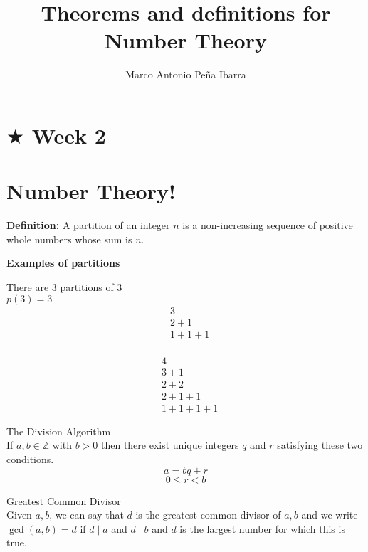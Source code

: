 \documentclass{article}
\title{Theorems and definitions for\\ Number Theory}
\author{Marco Antonio Peña Ibarra}
\date{}
\begin{document}
\maketitle


\section*{$\bigstar$ Week 2}
\section*{Number Theory!}

\textbf{Definition:} A \underline{partition} of an integer \(n\) is a non-increasing sequence of positive whole numbers whose sum is \(n\).\\[0.5cm]

    \centerline{\textbf{Examples of partitions}}
    \begin{adjustwidth}{40pt}{40pt}
    There are 3 partitions of 3 \\ \(p(3)=3\)
    \begin{align*}
        &3\\
        &2+1\\
        &1+1+1\\
    \end{align*}
    
    \begin{align*}
        &4\\
        &3+1\\
        &2+2\\
        &2+1+1\\
        &1+1+1+1
    \end{align*}
    \end{adjustwidth}

 The Division Algorithm\\
If \(a,b \in  \mathbb{Z}\) with \(b>0\) then there exist unique integers \(q\) and \(r\) satisfying these two conditions.
\[a=bq+r\]
\[0 \leq r <b\]

 Greatest Common Divisor\\
Given \(a,b\), we can say that \(d\) is the greatest common divisor of \(a,b\) and we write \(\gcd(a,b)=d\) if \(d \mid a\) and \(d \mid b\) and \(d\) is the largest number for which this is true.\\[0.5cm]
    
\end{document}
